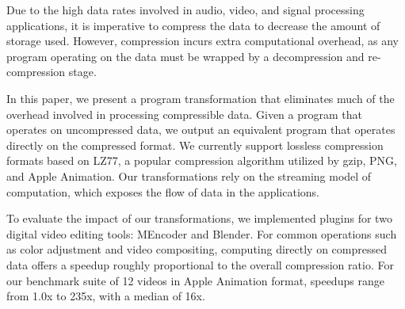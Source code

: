Due to the high data rates involved in audio, video, and signal
processing applications, it is imperative to compress the data to
decrease the amount of storage used.  However, compression incurs
extra computational overhead, as any program operating on the data
must be wrapped by a decompression and re-compression stage.

In this paper, we present a program transformation that eliminates
much of the overhead involved in processing compressible data.  Given
a program that operates on uncompressed data, we output an equivalent
program that operates directly on the compressed format.  We currently
support lossless compression formats based on LZ77, a popular
compression algorithm utilized by gzip, PNG, and Apple Animation.  Our
transformations rely on the streaming model of computation, which
exposes the flow of data in the applications.

To evaluate the impact of our transformations, we implemented plugins
for two digital video editing tools: MEncoder and Blender.  For common
operations such as color adjustment and video compositing, computing
directly on compressed data offers a speedup roughly proportional to
the overall compression ratio.  For our benchmark suite of 12 videos
in Apple Animation format, speedups range from 1.0x to 235x, with a
median of 16x.
